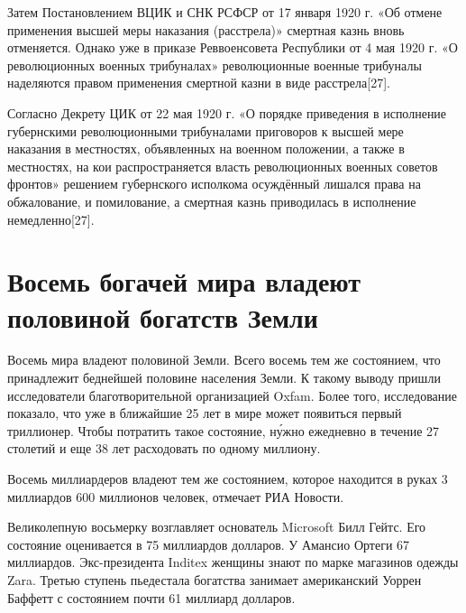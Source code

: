 Затем Постановлением ВЦИК и СНК РСФСР от 17 января 1920 г. «Об отмене применения высшей меры наказания (расстрела)» смертная казнь вновь отменяется. Однако уже в приказе Реввоенсовета Республики от 4 мая 1920 г. «О революционных военных трибуналах» революционные военные трибуналы наделяются правом применения смертной казни в виде расстрела[27].

Согласно Декрету ЦИК от 22 мая 1920 г. «О порядке приведения в исполнение губернскими революционными трибуналами приговоров к высшей мере наказания в местностях, объявленных на военном положении, а также в местностях, на кои распространяется власть революционных военных советов фронтов» решением губернского исполкома осуждённый лишался права на обжалование, и помилование, а смертная казнь приводилась в исполнение немедленно[27].

\clearpage



\section{Восемь богачей мира владеют половиной богатств Земли}
Восемь  мира владеют половиной  Земли. Всего восемь   тем же состоянием, что принадлежит беднейшей половине населения Земли. К такому выводу пришли исследователи благотворительной организацией Oxfam. Более того, исследование показало, что уже в ближайшие 25 лет в мире может появиться первый триллионер. Чтобы потратить такое состояние, н\'{у}жно ежедневно в течение 27 столетий и еще 38 лет расходовать по одному миллиону.

Восемь миллиардеров владеют тем же состоянием, которое находится в руках 3 миллиардов 600 миллионов человек, отмечает РИА Новости.

Великолепную восьмерку возглавляет основатель Microsoft Билл Гейтс. Его состояние оценивается в 75 миллиардов долларов. У Амансио Ортеги 67 миллиардов. Экс-президента Inditex женщины знают по марке магазинов одежды Zara. Третью ступень пьедестала богатства занимает американский  Уоррен Баффетт с состоянием почти 61 миллиард долларов.

